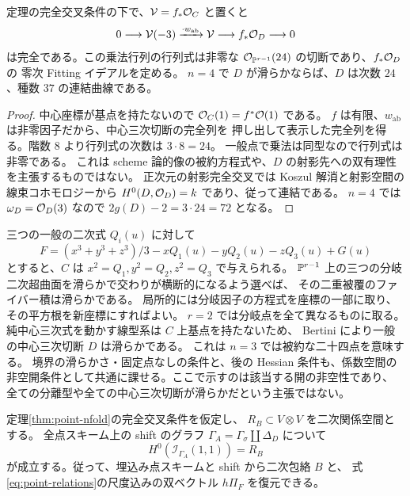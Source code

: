 \begin{corollary}[中心射影と二十四次の行列式]\label{cor:point-norm}
定理の完全交叉条件の下で、$\mathcal V=f_*\mathcal O_C$ と置くと
\begin{equation}\label{eq:point-norm-sequence}
 0\longrightarrow\mathcal V(-3)
 \xrightarrow{\cdot w_{\mathrm{ab}}}\mathcal V
 \longrightarrow f_*\mathcal O_D\longrightarrow0
\end{equation}
は完全である。この乗法行列の行列式は非零な
$\mathcal O_{\mathbb P^{r-1}}(24)$ の切断であり、$f_*\mathcal O_D$ の
零次 Fitting イデアルを定める。
$n=4$ で $D$ が滑らかならば、$D$ は次数 $24$、種数 $37$ の連結曲線である。
\end{corollary}

\begin{proof}
中心座標が基点を持たないので $\mathcal O_C(1)=f^*\mathcal O(1)$ である。
$f$ は有限、$w_{\mathrm{ab}}$ は非零因子だから、中心三次切断の完全列を
押し出して表示した完全列を得る。階数 $8$ より行列式の次数は $3\cdot8=24$。
一般点で乗法は同型なので行列式は非零である。
これは scheme 論的像の被約方程式や、$D$ の射影先への双有理性を主張するものではない。
正次元の射影完全交叉では Koszul 解消と射影空間の線束コホモロジーから
$H^0(D,\mathcal O_D)=k$ であり、従って連結である。
$n=4$ では $\omega_D=\mathcal O_D(3)$ なので
$2g(D)-2=3\cdot24=72$ となる。
\end{proof}

\begin{remark}[滑らかな定常成分の非空性]\label{rem:point-nonempty}
三つの一般の二次式 $Q_i(u)$ に対して
\[
 F=(x^3+y^3+z^3)/3-xQ_1(u)-yQ_2(u)-zQ_3(u)+G(u)
\]
とすると、$C$ は $x^2=Q_1,y^2=Q_2,z^2=Q_3$ で与えられる。
$\mathbb P^{r-1}$ 上の三つの分岐二次超曲面を滑らかで交わりが横断的になるよう選べば、
その二重被覆のファイバー積は滑らかである。
局所的には分岐因子の方程式を座標の一部に取り、その平方根を新座標にすればよい。
$r=2$ では分岐点を全て異なるものに取る。
純中心三次式を動かす線型系は $C$ 上基点を持たないため、
Bertini により一般の中心三次切断 $D$ は滑らかである。
これは $n=3$ では被約な二十四点を意味する。
境界の滑らかさ・固定点なしの条件と、後の Hessian 条件も、係数空間の
非空開条件として共通に課せる。ここで示すのは該当する開の非空性であり、
全ての分離型や全ての中心三次切断が滑らかだという主張ではない。
\end{remark}

\begin{theorem}[点対応からの包絡復元]\label{thm:point-envelope}
定理\ref{thm:point-nfold}の完全交叉条件を仮定し、
$R_B\subset V\otimes V$ を二次関係空間とする。
全点スキーム上の shift のグラフ
$\Gamma_A=\Gamma_\sigma\amalg\Delta_D$ について
\begin{equation}\label{eq:point-envelope}
 H^0(\mathcal I_{\Gamma_A}(1,1))=R_B
\end{equation}
が成立する。従って、埋込み点スキームと shift から二次包絡 $B$ と、
式\eqref{eq:point-relations}の尺度込みの双ベクトル $h\Pi_F$ を復元できる。
\end{theorem}

